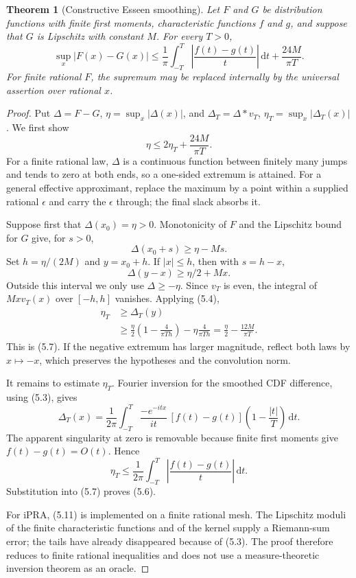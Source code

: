 \documentclass[11pt]{article}
\newtheorem{theorem}{Theorem}[section]
\newcommand{\dd}{\,\mathrm d}
\newcommand{\abs}[1]{\left|#1\right|}
\newcommand{\ipra}{\mathrm{iPRA}}
\begin{document}
\begin{theorem}[Constructive Esseen smoothing]\label{thm:esseen}
Let \(F\) and \(G\) be distribution functions with finite first moments,
characteristic functions \(f\) and \(g\), and suppose that \(G\) is
Lipschitz with constant \(M\).  For every \(T>0\),
\[
 \sup_x|F(x)-G(x)|
 \le \frac1\pi\int_{-T}^{T}
        \abs{\frac{f(t)-g(t)}{t}}\dd t
      +\frac{24M}{\pi T}.                              \tag{5.6}
\]
For finite rational \(F\), the supremum may be replaced internally by the
universal assertion over rational \(x\).
\end{theorem}

\begin{proof}
Put \(\Delta=F-G\), \(\eta=\sup_x|\Delta(x)|\), and
\(\Delta_T=\Delta*v_T\), \(\eta_T=\sup_x|\Delta_T(x)|\).
We first show
\[
 \eta\le2\eta_T+\frac{24M}{\pi T}.                    \tag{5.7}
\]
For a finite rational law, \(\Delta\) is a continuous function between
finitely many jumps and tends to zero at both ends, so a one-sided extremum
is attained.  For a general effective approximant, replace the maximum by a
point within a supplied rational \(\epsilon\) and carry the \(\epsilon\)
through; the final slack absorbs it.

Suppose first that \(\Delta(x_0)=\eta>0\).  Monotonicity of \(F\) and the
Lipschitz bound for \(G\) give, for \(s>0\),
\[
 \Delta(x_0+s)\ge\eta-Ms.                              \tag{5.8}
\]
Set \(h=\eta/(2M)\) and \(y=x_0+h\).  If \(|x|\le h\), then with
\(s=h-x\),
\[
 \Delta(y-x)\ge\eta/2+Mx.                             \tag{5.9}
\]
Outside this interval we only use \(\Delta\ge-\eta\).  Since \(v_T\) is
even, the integral of \(Mxv_T(x)\) over \([-h,h]\) vanishes.  Applying
(5.4),
\begin{align*}
 \eta_T&\ge\Delta_T(y)\\
 &\ge \frac\eta2\left(1-\frac4{\pi Th}\right)
       -\eta\frac4{\pi Th}
  =\frac\eta2-\frac{12M}{\pi T}.                     \tag{5.10}
\end{align*}
This is (5.7).  If the negative extremum has larger magnitude, reflect both
laws by \(x\mapsto-x\), which preserves the hypotheses and the convolution
norm.

It remains to estimate \(\eta_T\).  Fourier inversion for the smoothed CDF
difference, using (5.3), gives
\[
 \Delta_T(x)=\frac{1}{2\pi}\int_{-T}^{T}
  \frac{-e^{-itx}}{it}\,[f(t)-g(t)]
  \left(1-\frac{|t|}{T}\right)\dd t.                 \tag{5.11}
\]
The apparent singularity at zero is removable because finite first moments
give \(f(t)-g(t)=O(t)\).  Hence
\[
 \eta_T\le\frac1{2\pi}\int_{-T}^{T}
       \abs{\frac{f(t)-g(t)}{t}}\dd t.                \tag{5.12}
\]
Substitution into (5.7) proves (5.6).

For \(\ipra\), (5.11) is implemented on a finite rational mesh.  The
Lipschitz moduli of the finite characteristic functions and of the kernel
supply a Riemann-sum error; the tails have already disappeared because of
(5.3).  The proof therefore reduces to finite rational inequalities and does
not use a measure-theoretic inversion theorem as an oracle.
\end{proof}
\end{document}
